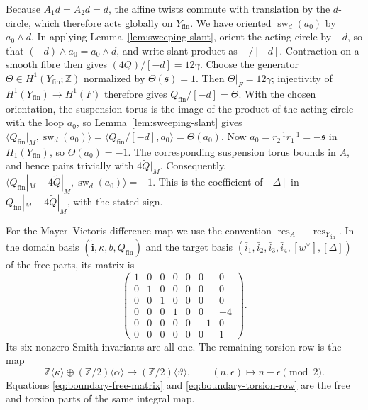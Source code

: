 \documentclass[11pt]{article}
\theoremstyle{definition}
\theoremstyle{remark}
\numberwithin{equation}{section}
\begin{document}
Because $A_1d=A_2d=d$, the affine twists commute with translation by the
$d$-circle, which therefore acts globally
on $Y_{\mathrm{fin}}$.  We have oriented
$\operatorname{sw}_d(a_0)$ by $a_0\wedge d$.  In applying
Lemma~\ref{lem:sweeping-slant}, orient the acting circle by $-d$, so that
$(-d)\wedge a_0=a_0\wedge d$, and write slant product as
${-}/[-d]$.  Contraction on a smooth fibre then gives
$(4Q)/[-d]=12\gamma$.  Choose the generator
$\Theta\in H^1(Y_{\mathrm{fin}};\mathbb Z)$ normalized by
$\Theta(\mathfrak s)=1$.  Then $\Theta|_F=12\gamma$; injectivity of
$H^1(Y_{\mathrm{fin}})\to H^1(F)$ therefore gives
$Q_{\mathrm{fin}}/[-d]=\Theta$.  With the chosen orientation, the suspension torus
is the image of the product of the acting circle with the loop $a_0$, so
Lemma~\ref{lem:sweeping-slant} gives
$\langle Q_{\mathrm{fin}}|_M,\operatorname{sw}_{d}(a_0)\rangle
=\langle Q_{\mathrm{fin}}/[-d],a_0\rangle=\Theta(a_0)$.
Now $a_0=r_2^{-1}r_1^{-1}=-\mathfrak s$ in
$H_1(Y_{\mathrm{fin}})$, so $\Theta(a_0)=-1$.  The corresponding
suspension torus bounds in $A$, and hence pairs trivially with
$4\widetilde Q|_M$.  Consequently,
$\langle Q_{\mathrm{fin}}|_M-4\widetilde Q|_M,
\operatorname{sw}_{d}(a_0)\rangle=-1$.
This is the coefficient of $[\Delta]$ in
$Q_{\mathrm{fin}}|_M-4\widetilde Q|_M$, with the stated sign.

For the Mayer--Vietoris difference map we use the convention
$\operatorname{res}_A-\operatorname{res}_{Y_{\mathrm{fin}}}$.
In the domain basis
$(\widetilde{\mathbf i},\kappa,b,Q_{\mathrm{fin}})$ and the target basis
$(\bar i_1,\bar i_2,\bar i_3,\bar i_4,[w^\vee],[\Delta])$ of the free
parts, its matrix is
\begin{equation}\label{eq:boundary-free-matrix}
 \begin{pmatrix}
 1&0&0&0&0& 0& 0\\
 0&1&0&0&0& 0& 0\\
 0&0&1&0&0& 0& 0\\
 0&0&0&1&0& 0&-4\\
 0&0&0&0&0&-1& 0\\
 0&0&0&0&0& 0& 1
 \end{pmatrix}.
\end{equation}
Its six nonzero Smith invariants are all one.  The remaining torsion row is
the map
\begin{equation}\label{eq:boundary-torsion-row}
 \mathbb Z\langle\kappa\rangle\oplus
 (\mathbb Z/2)\langle\alpha\rangle
 \longrightarrow(\mathbb Z/2)\langle\vartheta\rangle,
 \qquad (n,\epsilon)\longmapsto n-\epsilon\pmod2.
\end{equation}
Equations \eqref{eq:boundary-free-matrix} and
\eqref{eq:boundary-torsion-row} are the free and torsion parts of the same
integral map.
\end{document}
